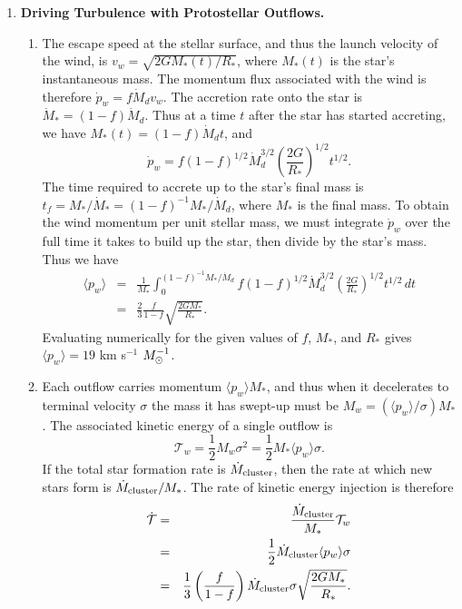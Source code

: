 \begin{enumerate}
\begin{enumerate}
\end{enumerate}

\item \textbf{Driving Turbulence with Protostellar Outflows.}

\begin{enumerate}

\item The escape speed at the stellar surface, and thus the launch velocity of the wind, is $v_w = \sqrt{2G M_*(t)/R_*}$, where $M_*(t)$ is the star's instantaneous mass. The momentum flux associated with the wind is therefore $\dot{p}_w = f \dot{M}_d v_w$. The accretion rate onto the star is $\dot{M}_* = (1-f) \dot{M}_d$. Thus at a time $t$ after the star has started accreting, we have $M_*(t) = (1-f) \dot{M}_d t$, and
\begin{displaymath}
\dot{p}_w = f (1-f)^{1/2} \dot{M}_d^{3/2} \left(\frac{2G}{R_*}\right)^{1/2} t^{1/2}.
\end{displaymath}
The time required to accrete up to the star's final mass is $t_f = M_*/\dot{M}_* = (1-f)^{-1} M_*/\dot{M}_d$, where $M_*$ is the final mass. To obtain the wind momentum per unit stellar mass, we must integrate $\dot{p}_w$ over the full time it takes to build up the star, then divide by the star's mass. Thus we have
\begin{eqnarray*}
\langle p_w\rangle & = & \frac{1}{M_*} \int_0^{(1-f)^{-1} M_*/\dot{M}_d} f (1-f)^{1/2} \dot{M}_d^{3/2} \left(\frac{2G}{R_*}\right)^{1/2} t^{1/2}\, dt \\
& = & \frac{2}{3} \frac{f}{1-f} \sqrt{\frac{2 G M_*}{R_*}}.
\end{eqnarray*}
Evaluating numerically for the given values of $f$, $M_*$, and $R_*$ gives $\langle p_w\rangle = 19$ km s$^{-1}$ $M_{\odot}^{-1}$.

\item Each outflow carries momentum $\langle p_w\rangle M_*$, and thus when it decelerates to terminal velocity $\sigma$ the mass it has swept-up must be $M_w = (\langle p_w\rangle/\sigma) M_*$. The associated kinetic energy of a single outflow is 
\begin{displaymath}
\mathcal{T}_w = \frac{1}{2} M_w \sigma^2 = \frac{1}{2} M_* \langle p_w\rangle \sigma.
\end{displaymath}
If the total star formation rate is $\dot{M}_{\rm cluster}$, then the rate at which new stars form is $\dot{M}_{\rm cluster}/M_*$. The rate of kinetic energy injection is therefore
\begin{eqnarray*}
\dot{\mathcal{T}} & = & \frac{\dot{M}_{\rm cluster}}{M_*} \mathcal{T}_w \\
& = & \frac{1}{2} \dot{M}_{\rm cluster} \langle p_w\rangle \sigma \\
& = & \frac{1}{3}\left(\frac{f}{1-f}\right) \dot{M}_{\rm cluster} \sigma \sqrt{\frac{2 G M_*}{R_*}}.
\end{eqnarray*}


\end{enumerate}
\end{enumerate}

